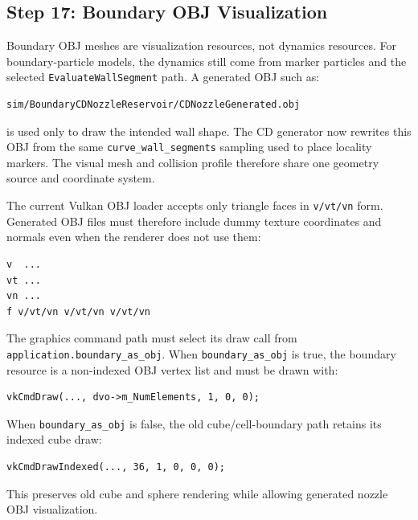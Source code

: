 \subsection{Step 17: Boundary OBJ Visualization}

Boundary OBJ meshes are visualization resources, not dynamics resources.  For
boundary-particle models, the dynamics still come from marker particles and
the selected \texttt{EvaluateWallSegment} path.  A generated OBJ such as:
\begin{verbatim}
sim/BoundaryCDNozzleReservoir/CDNozzleGenerated.obj
\end{verbatim}
is used only to draw the intended wall shape.  The CD generator now rewrites
this OBJ from the same \texttt{curve\_wall\_segments} sampling used to place
locality markers.  The visual mesh and collision profile therefore share one
geometry source and coordinate system.

The current Vulkan OBJ loader accepts only triangle faces in
\texttt{v/vt/vn} form.  Generated OBJ files must therefore include dummy
texture coordinates and normals even when the renderer does not use them:
\begin{verbatim}
v  ...
vt ...
vn ...
f v/vt/vn v/vt/vn v/vt/vn
\end{verbatim}

The graphics command path must select its draw call from
\texttt{application.boundary\_as\_obj}.  When \texttt{boundary\_as\_obj} is
true, the boundary resource is a non-indexed OBJ vertex list and must be drawn
with:
\begin{verbatim}
vkCmdDraw(..., dvo->m_NumElements, 1, 0, 0);
\end{verbatim}
When \texttt{boundary\_as\_obj} is false, the old cube/cell-boundary path
retains its indexed cube draw:
\begin{verbatim}
vkCmdDrawIndexed(..., 36, 1, 0, 0, 0);
\end{verbatim}
This preserves old cube and sphere rendering while allowing generated nozzle
OBJ visualization.
